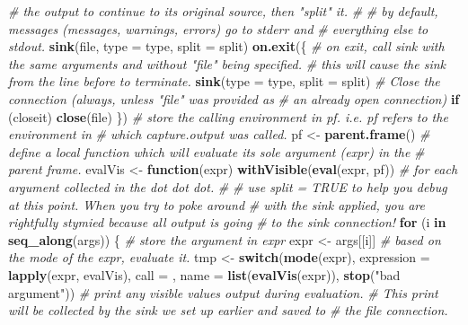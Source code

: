 \documentclass[]{book}
\newenvironment{Shaded}{\begin{snugshade}}{\end{snugshade}}
\newcommand{\CommentTok}[1]{\textcolor[rgb]{0.56,0.35,0.01}{\textit{#1}}}
\newcommand{\ControlFlowTok}[1]{\textcolor[rgb]{0.13,0.29,0.53}{\textbf{#1}}}
\newcommand{\DataTypeTok}[1]{\textcolor[rgb]{0.13,0.29,0.53}{#1}}
\newcommand{\KeywordTok}[1]{\textcolor[rgb]{0.13,0.29,0.53}{\textbf{#1}}}
\newcommand{\NormalTok}[1]{#1}
\newcommand{\StringTok}[1]{\textcolor[rgb]{0.31,0.60,0.02}{#1}}
\begin{document}
\begin{Shaded}
\begin{Highlighting}[]
  \CommentTok{# the output to continue to its original source, then "split" it.}
  \CommentTok{#}
  \CommentTok{# by default, messages (messages, warnings, errors) go to stderr and}
  \CommentTok{# everything else to stdout.}
  \KeywordTok{sink}\NormalTok{(file, }\DataTypeTok{type =}\NormalTok{ type, }\DataTypeTok{split =}\NormalTok{ split)}
  \KeywordTok{on.exit}\NormalTok{(\{}
    \CommentTok{# on exit, call sink with the same arguments and without "file" being specified.}
    \CommentTok{# this will cause the sink from the line before to terminate.}
    \KeywordTok{sink}\NormalTok{(}\DataTypeTok{type =}\NormalTok{ type, }\DataTypeTok{split =}\NormalTok{ split)}
    \CommentTok{# Close the connection (always, unless "file" was provided as}
    \CommentTok{# an already open connection)}
    \ControlFlowTok{if}\NormalTok{ (closeit) }\KeywordTok{close}\NormalTok{(file)}
\NormalTok{  \})}
  \CommentTok{# store the calling environment in pf.  i.e. pf refers to the environment in}
  \CommentTok{# which capture.output was called.}
\NormalTok{  pf <-}\StringTok{ }\KeywordTok{parent.frame}\NormalTok{()}
  \CommentTok{# define a local function which will evaluate its sole argument (expr) in the}
  \CommentTok{# parent frame.}
\NormalTok{  evalVis <-}\StringTok{ }\ControlFlowTok{function}\NormalTok{(expr) }\KeywordTok{withVisible}\NormalTok{(}\KeywordTok{eval}\NormalTok{(expr, pf))}
  \CommentTok{# for each argument collected in the dot dot dot.}
  \CommentTok{#}
  \CommentTok{# use split = TRUE to help you debug at this point.  When you try to poke around}
  \CommentTok{# with the sink applied, you are rightfully stymied because all output is going}
  \CommentTok{# to the sink connection!}
  \ControlFlowTok{for}\NormalTok{ (i }\ControlFlowTok{in} \KeywordTok{seq_along}\NormalTok{(args)) \{}
    \CommentTok{# store the argument in expr}
\NormalTok{    expr <-}\StringTok{ }\NormalTok{args[[i]]}
    \CommentTok{# based on the mode of the expr, evaluate it.}
\NormalTok{    tmp <-}\StringTok{ }\ControlFlowTok{switch}\NormalTok{(}\KeywordTok{mode}\NormalTok{(expr),}
                  \DataTypeTok{expression =} \KeywordTok{lapply}\NormalTok{(expr, evalVis),}
                  \DataTypeTok{call =}\NormalTok{ ,}
                  \DataTypeTok{name =} \KeywordTok{list}\NormalTok{(}\KeywordTok{evalVis}\NormalTok{(expr)),}
                  \KeywordTok{stop}\NormalTok{(}\StringTok{"bad argument"}\NormalTok{))}
    \CommentTok{# print any visible values output during evaluation.}
    \CommentTok{# This print will be collected by the sink we set up earlier and saved to}
    \CommentTok{# the file connection.}

\end{Highlighting}
\end{Shaded}
\end{document}
